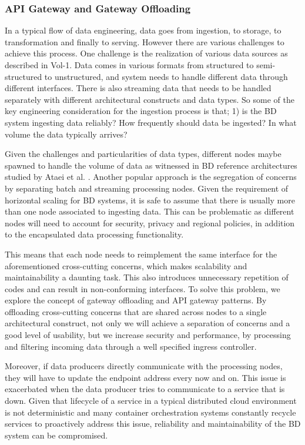 \documentclass{bmcart}
\begin{document}
\subsubsection{API Gateway and Gateway Offloading}

In a typical flow of data engineering, data goes from ingestion, to storage, to transformation and finally to serving. However there are various challenges to achieve this process. One challenge is the realization of various data sources as described in Vol-1. Data comes in various formats from structured to semi-structured to unstructured, and system needs to handle different data through different interfaces. There is also streaming data that needs to be handled separately with different architectural constructs and data types. So some of the key engineering consideration for the ingestion process is that; 1) is the BD system ingesting data reliably? How frequently should data be ingested? In what volume the data typically arrives?

Given the challenges and particularities of data types, different nodes maybe spawned to handle the volume of data as witnessed in BD reference architectures studied by Ataei et al. \cite{ataei2020big}. Another popular approach is the segregation of concerns by separating batch and streaming processing nodes. Given the requirement of horizontal scaling for BD systems, it is safe to assume that there is usually more than one node associated to ingesting data. This can be problematic as different nodes will need to account for security, privacy and regional policies, in addition to the encapsulated data processing functionality. 

This means that each node needs to reimplement the same interface for the aforementioned cross-cutting concerns, which makes scalability and maintainability a daunting task. This also introduces unnecessary repetition of codes and can result in non-conforming interfaces. To solve this problem, we explore the concept of gateway offloading and API gateway patterns. By offloading cross-cutting concerns that are shared across nodes to a single architectural construct, not only we will achieve a separation of concerns and a good level of usability, but we increase security and performance, by processing and filtering incoming data through a well specified ingress controller.

Moreover, if data producers directly communicate with the processing nodes, they will have to update the endpoint address every now and on. This issue is exacerbated when the data producer tries to communicate to a service that is down. Given that lifecycle of a service in a typical distributed cloud environment is not deterministic and many container orchestration systems constantly recycle services to proactively address this issue, reliability and maintainability of the BD system can be compromised.
\end{document}
